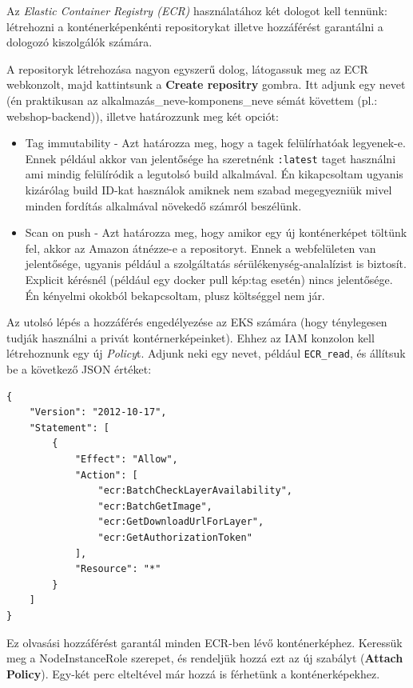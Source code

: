 Az \textit{Elastic Container Registry (ECR)} használatához két dologot kell tennünk: létrehozni a konténerképenkénti repositorykat illetve hozzáférést garantálni a dologozó kiszolgálók számára.

A repositoryk létrehozása nagyon egyszerű dolog, látogassuk meg az ECR webkonzolt, majd kattintsunk a \textbf{Create repositry} gombra. Itt adjunk egy nevet (én praktikusan az alkalmazás\_neve-komponens\_neve sémát követtem (pl.: webshop-backend)), illetve határozzunk meg két opciót:
\begin{itemize}
    \item Tag immutability - Azt határozza meg, hogy a tagek felülírhatóak legyenek-e. Ennek például akkor van jelentősége ha szeretnénk \lstinline{:latest} taget használni ami mindig felülíródik a legutolsó build alkalmával. Én kikapcsoltam ugyanis kizárólag build ID-kat használok amiknek nem szabad megegyezniük mivel minden fordítás alkalmával növekedő számról beszélünk.
    \item Scan on push - Azt határozza meg, hogy amikor egy új konténerképet töltünk fel, akkor az Amazon átnézze-e a repositoryt. Ennek a webfelületen van jelentősége, ugyanis például a szolgáltatás sérülékenység-analalízist is biztosít. Explicit kérésnél (például egy docker pull kép:tag esetén) nincs jelentősége. Én kényelmi okokból bekapcsoltam, plusz költséggel nem jár.
\end{itemize}

Az utolsó lépés a hozzáférés engedélyezése az EKS számára (hogy ténylegesen tudják használni a privát kontérnerképeinket). Ehhez az IAM konzolon kell létrehoznunk egy új \textit{Policy}t. Adjunk neki egy nevet, például \lstinline{ECR_read}, és állítsuk be a következő JSON értéket\cite{ECR_IAM}:
\newpage
\begin{lstlisting}
{
    "Version": "2012-10-17",
    "Statement": [
        {
            "Effect": "Allow",
            "Action": [
                "ecr:BatchCheckLayerAvailability",
                "ecr:BatchGetImage",
                "ecr:GetDownloadUrlForLayer",
                "ecr:GetAuthorizationToken"
            ],
            "Resource": "*"
        }
    ]
}
\end{lstlisting}
Ez olvasási hozzáférést garantál minden ECR-ben lévő konténerképhez. Keressük meg a NodeInstanceRole szerepet, és rendeljük hozzá ezt az új szabályt (\textbf{Attach Policy}). Egy-két perc elteltével már hozzá is férhetünk a konténerképekhez.

